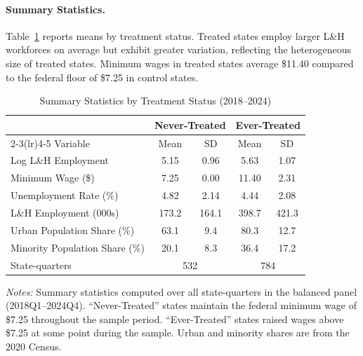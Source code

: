 \documentclass[12pt]{article}
\begin{document}
\paragraph{Summary Statistics.}
Table~\ref{tab:summary} reports means by treatment status.  Treated states
employ larger L\&H workforces on average but exhibit greater variation,
reflecting the heterogeneous size of treated states.  Minimum wages in treated
states average \$11.40 compared to the federal floor of \$7.25 in control
states.

\begin{table}[H]
  \centering
  \caption{Summary Statistics by Treatment Status (2018--2024)}
  \label{tab:summary}
  \begin{threeparttable}
  \begin{tabular}{lcccc}
    \toprule
    & \multicolumn{2}{c}{\textbf{Never-Treated}} &
      \multicolumn{2}{c}{\textbf{Ever-Treated}} \\
    \cmidrule(lr){2-3}\cmidrule(lr){4-5}
    Variable & Mean & SD & Mean & SD \\
    \midrule
    Log L\&H Employment       & 5.15 & 0.96 & 5.63 & 1.07 \\
    Minimum Wage (\$)          & 7.25 & 0.00 & 11.40 & 2.31 \\
    Unemployment Rate (\%)     & 4.82 & 2.14 & 4.44 & 2.08 \\
    L\&H Employment (000s)    & 173.2 & 164.1 & 398.7 & 421.3 \\
    Urban Population Share (\%) & 63.1 & 9.4 & 80.3 & 12.7 \\
    Minority Population Share (\%) & 20.1 & 8.3 & 36.4 & 17.2 \\
    \midrule
    State-quarters             & \multicolumn{2}{c}{532} & \multicolumn{2}{c}{784} \\
    \bottomrule
  \end{tabular}
  \begin{tablenotes}
    \small\item \textit{Notes:} Summary statistics computed over all
    state-quarters in the balanced panel (2018Q1--2024Q4). ``Never-Treated''
    states maintain the federal minimum wage of \$7.25 throughout the sample
    period.  ``Ever-Treated'' states raised wages above \$7.25 at some point
    during the sample.  Urban and minority shares are from the 2020 Census.
  \end{tablenotes}
  \end{threeparttable}
\end{table}
\end{document}
